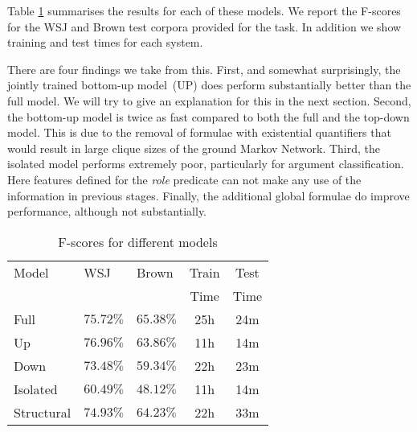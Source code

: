 Table \ref{tbl:results} summarises the results for each of these models. We report the F-scores for the WSJ and Brown test corpora provided for the task. In addition we show training and test times for each system. 

There are four findings we take from this. First, and somewhat surprisingly, the jointly trained bottom-up model~(UP) does perform substantially better than the full model. We will try to give an explanation for this in the next section. Second, the bottom-up model is twice as fast compared to both the full and the top-down model. This is due to the removal of formulae with existential quantifiers that would result in large clique sizes of the ground Markov Network. Third, the isolated model performs extremely poor, particularly for argument classification. Here features defined for the \emph{role} predicate can not make any use of the information in previous stages. Finally, the additional global formulae do improve performance, although not substantially.


\begin{table}
\begin{center}
\small
\begin{tabular}{|l|l|l|c|c|}\hline
Model                & WSJ                & Brown              & Train & Test\\
                     &                    &                    & Time & Time\\\hline\hline
Full         & $75.72\%$          & $\mathbf{65.38}\%$ & 25h & 24m\\\hline
Up            & $\mathbf{76.96\%}$ & $63.86\%$          & 11h & 14m\\\hline
Down             & $73.48\%$          & $59.34\%$          & 22h & 23m\\\hline
Isolated   & $60.49\%$          & $48.12\%$          & 11h & 14m\\\hline
Structural & $74.93\%$       & $64.23\%$          & 22h & 33m\\\hline   
\end{tabular}
\caption{F-scores for different models}
\label{tbl:results}
\normalsize
\end{center}
\end{table}



